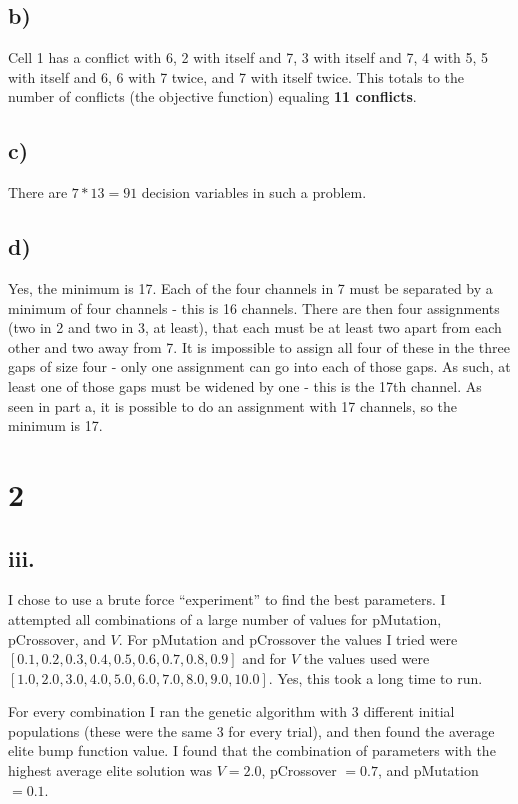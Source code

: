 \documentclass[12pt]{article}
\begin{document}
\subsection{b)}
Cell 1 has a conflict with 6, 2 with itself and 7, 3 with itself and 7, 4 with 5, 5 with itself and 6, 6 with 7 twice, and 7 with itself twice. This totals to the number of conflicts (the objective function) equaling \textbf{11 conflicts}.

\subsection{c)}
There are $7 * 13 = 91$ decision variables in such a problem.

\subsection{d)}
Yes, the minimum is 17. Each of the four channels in 7 must be separated by a minimum of four channels - this is 16 channels. There are then four assignments (two in 2 and two in 3, at least), that each must be at least two apart from  each other and two away from 7. It is impossible to assign all four of these in the three gaps of size four - only one assignment can go into each of those gaps. As such, at least one of those gaps must be widened by one - this is the 17th channel. As seen in part a, it is possible to do an assignment with 17 channels, so the minimum is 17.

\newpage
\section{2}
\subsection{iii.}
I chose to use a brute force ``experiment'' to find the best parameters.  I attempted all combinations of a large number of values for pMutation, pCrossover, and $V$.  For pMutation and pCrossover the values I tried were $[0.1, 0.2, 0.3, 0.4, 0.5, 0.6, 0.7, 0.8, 0.9]$ and for $V$ the values used were $[1.0, 2.0, 3.0, 4.0, 5.0, 6.0, 7.0, 8.0, 9.0, 10.0]$.  Yes, this took a long time to run.

For every combination I ran the genetic algorithm with 3 different initial populations (these were the same 3 for every trial), and then found the average elite bump function value.  I found that the combination of parameters with the highest average elite solution was $V=2.0$, pCrossover $=0.7$, and pMutation $=0.1$.
\end{document}
